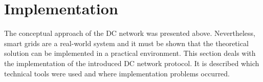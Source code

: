 \section{Implementation}
\label{sec:implementation}




The conceptual approach of the DC network was presented above. Nevertheless, smart grids are a real-world system and it must be shown that the theoretical solution can be implemented in a practical environment. This section deals with the implementation of the introduced DC network protocol. It is described which technical tools were used and where implementation problems occurred.
